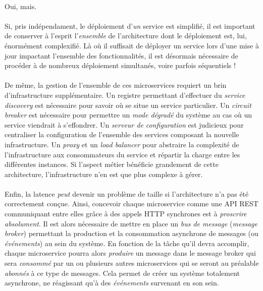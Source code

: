 \paragraph{} Oui, mais.

\paragraph{} Si, pris indépendament, le déploiement d'\emph{un} service est simplifié, il est important de conserver
à l'esprit l'\emph{ensemble} de l'architecture dont le déploiement est, lui, énormément complexifié. Là où il suffisait de 
déployer un service lors d'une mise à jour impactant l'ensemble des fonctionnalités, il est désormais nécessaire de procéder 
à de nombreux déploiement simultanés, voire parfois séquentiels !

\paragraph{} De même, la gestion de l'ensemble de ces microservices requiert un brin d'infrastructure supplémentaire.
Un registre permettant d'effectuer du \emph{service discovery} est nécessaire pour savoir où se situe un service particulier.
Un \emph{circuit breaker} est nécessaire pour permettre un \emph{mode dégradé} du système au cas où un service viendrait
à s'effondrer. Un \emph{serveur de configuration} est judicieux pour centraliser la configuration de l'ensemble des services
composant la nouvelle infrastructure. Un \emph{proxy} et un \emph{load balancer} pour abstraire la complexité de l'infrastructure
aux consommateurs du service et répartir la charge entre les différentes instances. Si l'aspect métier bénéficie grandement
de cette architecture, l'infrastructure n'en est que plus complexe à gérer.

\paragraph{} Enfin, la latence \emph{peut} devenir un problème de taille si l'architecture n'a pas été correctement conçue.
Ainsi, concevoir chaque microservice comme une API REST communiquant entre elles grâce à des appels HTTP synchrones est à
\emph{proscrire absolument}. Il est alors nécessaire de mettre en place un \emph{bus de message} (\emph{message broker})
permettant la production et la consommation asynchrone de messages (ou \emph{événements}) au sein du système. En fonction
de la tâche qu'il devra accomplir, chaque microservice pourra alors \emph{produire} un message dans le message broker qui
sera \emph{consommé} par un ou plusieurs autres microservices qui se seront au préalable \emph{abonnés} à ce type de messages.
Cela permet de créer un système totalement asynchrone, ne réagissant qu'à des \emph{événements} survenant en son sein.


